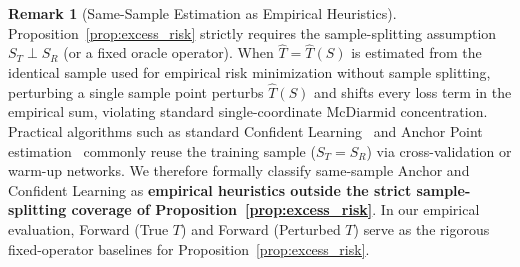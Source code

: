 \documentclass[journal]{IEEEtran}
\theoremstyle{definition}
\newtheorem{remark}{Remark}
\begin{document}
\begin{remark}[Same-Sample Estimation as Empirical Heuristics]
\label{rem:same_sample}
Proposition~\ref{prop:excess_risk} strictly requires the sample-splitting assumption $S_T \perp S_R$ (or a fixed oracle operator). When $\hat{T} = \hat{T}(S)$ is estimated from the identical sample used for empirical risk minimization without sample splitting, perturbing a single sample point perturbs $\hat{T}(S)$ and shifts every loss term in the empirical sum, violating standard single-coordinate McDiarmid concentration. Practical algorithms such as standard Confident Learning~\cite{northcutt2021confident} and Anchor Point estimation~\cite{patrini2017making} commonly reuse the training sample ($S_T = S_R$) via cross-validation or warm-up networks. We therefore formally classify same-sample Anchor and Confident Learning as \textbf{empirical heuristics outside the strict sample-splitting coverage of Proposition~\ref{prop:excess_risk}}. In our empirical evaluation, Forward (True $T$) and Forward (Perturbed $T$) serve as the rigorous fixed-operator baselines for Proposition~\ref{prop:excess_risk}.
\end{remark}
\end{document}
